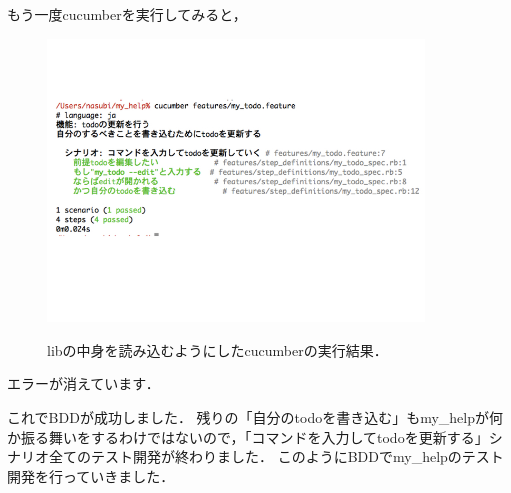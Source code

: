 もう一度cucumberを実行してみると，

\begin{figure}[htbp]\begin{center}
\includegraphics[width=10cm,bb= 0 0 737 553]{../figs/./cucumber05.001.jpg}
\caption{libの中身を読み込むようにしたcucumberの実行結果．}
\label{fig:cucumber05}
\label{default}\end{center}\end{figure}
エラーが消えています．

これでBDDが成功しました．
残りの「自分のtodoを書き込む」もmy\_helpが何か振る舞いをするわけではないので，「コマンドを入力してtodoを更新する」シナリオ全てのテスト開発が終わりました．
このようにBDDでmy\_helpのテスト開発を行っていきました．

